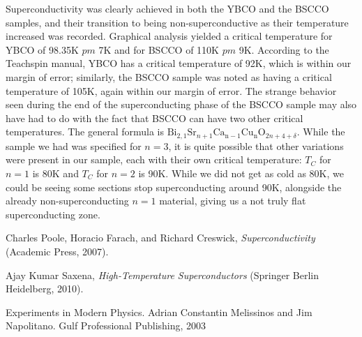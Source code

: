 \documentclass[prb,preprint]{revtex4-1}
\begin{document}
Superconductivity was clearly achieved in both the YBCO and the BSCCO samples, and their transition to being non-superconductive as their temperature increased was recorded. Graphical analysis yielded a critical temperature for YBCO of 98.35K $pm$ 7K and for BSCCO of 110K $pm$ 9K. According to the Teachspin manual, YBCO has a critical temperature of 92K, which is within our margin of error; similarly, the BSCCO sample was noted as having a critical temperature of 105K, again within our margin of error. The strange behavior seen during the end of the superconducting phase of the BSCCO sample may also have had to do with the fact that BSCCO can have two other critical temperatures. The general formula is $\textrm{Bi}_{2,1}\textrm{Sr}_{n+1}\textrm{Ca}_{\textrm{n}-1}\textrm{Cu}_{\textrm{n}}\textrm{O}_{2n+4+\delta}$. While the sample we had was specified for $n=3$, it is quite possible that other variations were present in our sample, each with their own critical temperature: $T_C$ for $n=1$ is 80K and $T_C$ for $n=2$ is 90K. While we did not get as cold as 80K, we could be seeing some sections stop superconducting around 90K, alongside the already non-superconducting $n=1$ material, giving us a not truly flat superconducting zone.


\begin{thebibliography}{99}

 Charles Poole, Horacio Farach, and Richard Creswick, \textit{Superconductivity} (Academic Press, 2007).

 Ajay Kumar Saxena, \textit{High-Temperature Superconductors} (Springer Berlin Heidelberg, 2010).

 Experiments in Modern Physics.  Adrian Constantin Melissinos and Jim Napolitano.  Gulf Professional Publishing, 2003



\end{thebibliography}

\end{document}
